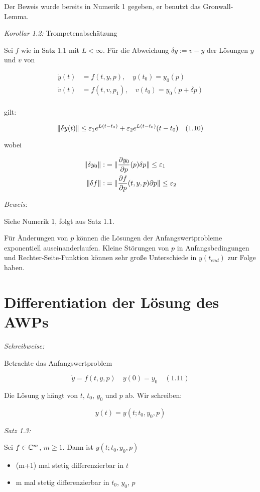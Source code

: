 Der Beweis wurde bereits in Numerik 1 gegeben, er benutzt das Gronwall-Lemma.

\emph{Korollar 1.2:} Trompetenabschätzung

Sei $f$ wie in Satz $1.1$ mit $L < \infty$. Für die Abweichung $\delta y := v-y$ der Lösungen $y$ und $v$ von

\begin{align*}
\dot y(t) &= f(t,y,p), \quad y(t_0) = y_0(p) \\
\dot v(t) &= f(t,v,p_1), \quad v(t_0) = y_0(p + \delta p) \\
\end{align*}

gilt:

\[ \|\delta y(t) \| \leq \varepsilon_1 e^{L(t-t_0)} + \varepsilon_2 e^{L(t-t_0)}(t-t_0) \quad (1.10)\]

wobei

\begin{align*}
\|\delta y_0\| :&= \| \frac{\partial y_0}{\partial p} (p) \delta p \| \leq \varepsilon_1 \\
\|\delta f\| :&= \| \frac{\partial f}{\partial p} (t,y,p) \partial p \| \leq \varepsilon_2
\end{align*}

\emph{Beweis:}

Siehe Numerik 1, folgt aus Satz 1.1.


Für Änderungen von $p$ können die Lösungen der Anfangswertprobleme exponentiell auseinanderlaufen. Kleine Störungen von $p$ in Anfangsbedingungen und Rechter-Seite-Funktion können sehr große Unterschiede in $y(t_{end})$ zur Folge haben.

\section*{Differentiation der Lösung des AWPs}

\emph{Schreibweise:}

Betrachte das Anfangswertproblem

\[ \dot y = f(t,y,p) \quad y(0) = y_0 \quad (1.11) \]

Die Lösung $y$ hängt von $t$, $t_0$, $y_0$ und $p$ ab. Wir schreiben:

\[ y(t) = y(t; t_0, y_0, p) \]

\emph{Satz 1.3:}

Sei $f \in \mathbb{C}^m$, $m \geq 1$. Dann ist $y(t; t_0, y_0, p)$

\begin{itemize}
\item (m+1) mal stetig differenzierbar in $t$
\item m mal stetig differenzierbar in $t_0$, $y_0$, $p$
\end{itemize}

